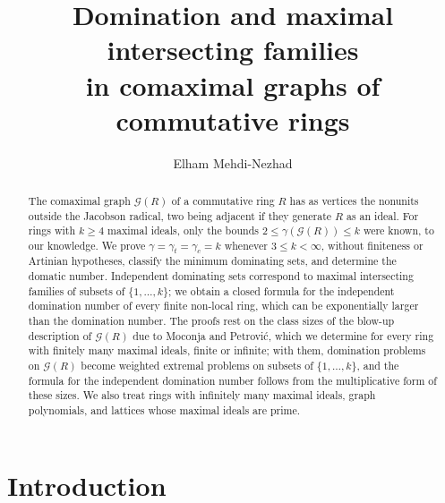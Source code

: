 \documentclass[11pt]{amsart}
\theoremstyle{definition}
\theoremstyle{remark}
\newcommand{\G}{\mathcal{G}}
\begin{document}
\title[Domination and maximal intersecting families]{Domination and maximal intersecting families\\
in comaximal graphs of commutative rings}

\author{Elham Mehdi-Nezhad}
\address{Department of Mathematics and Applied Mathematics, University of the Western Cape,
Private Bag X17, Bellville 7535, South Africa}


\begin{abstract}
The comaximal graph $\G(R)$ of a commutative ring $R$ has as vertices the nonunits outside the
Jacobson radical, two being adjacent if they generate $R$ as an ideal. For rings with $k\ge4$
maximal ideals, only the bounds $2\le\gamma(\G(R))\le k$ were known, to our knowledge. We prove
$\gamma=\gamma_t=\gamma_c=k$ whenever $3\le k<\infty$, without finiteness or Artinian hypotheses,
classify the minimum dominating sets, and determine the domatic number. Independent dominating sets
correspond to maximal intersecting families of subsets of $\{1,\dots,k\}$; we obtain a closed
formula for the independent domination number of every finite non-local ring, which can be
exponentially larger than the domination number. The proofs rest on the class sizes of the
blow-up description of $\G(R)$ due to Moconja and Petrovi\'c, which we determine for every ring with
finitely many maximal ideals, finite or infinite; with them, domination problems on $\G(R)$ become
weighted extremal problems on subsets of $\{1,\dots,k\}$, and the formula for the independent
domination number follows from the multiplicative form of these sizes. We also treat rings with
infinitely many maximal ideals, graph polynomials, and lattices whose maximal ideals are prime.
\end{abstract}

\maketitle

\section{Introduction}\label{sec:intro}
\end{document}
